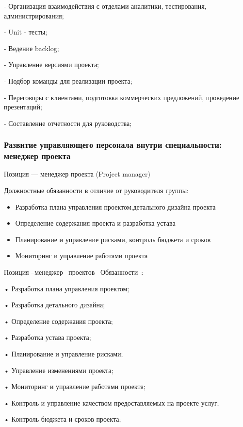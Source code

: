 \documentclass{../industrial-development}
\begin{document}
- Организация взаимодействия с отделами аналитики, тестирования, администрирования;

- Unit - тесты;

- Ведение backlog;

- Управление версиями проекта;

- Подбор команды для реализации проекта;

- Переговоры с клиентами, подготовка коммерческих предложений, проведение презентаций;

- Составление отчетности для руководства;

\begin{frame} \frametitle{Развитие управляющего персонала внутри специальности: менеджер проекта}
 \begin{block}{}
  \alert{Позиция --- менеджер проекта (Project manager)}

Должностные обязанности в отличие от руководителя группы: 
  \end{block}
  \begin{itemize}
  \item Разработка плана управления проектом,детального дизайна проекта

  \item Определение содержания проекта и разработка устава

 \item Планирование и управление рисками, контроль бюджета и сроков

  \item Мониторинг и управление работами проекта
  \end{itemize}
\end{frame}

\lecturenotes

Позиция –менеджер~\cite{hh} проектов~\cite{itcf}
Обязанности~\cite{rab}:

 • Разработка плана управления проектом;

• Разработка детального дизайна;

• Определение содержания проекта;

• Разработка устава проекта;

• Планирование и управление рисками;

• Управление изменениями проекта;

• Мониторинг и управление работами проекта;

• Контроль и управление качеством предоставляемых на проекте услуг;

• Контроль бюджета и сроков проекта;
\end{document}
